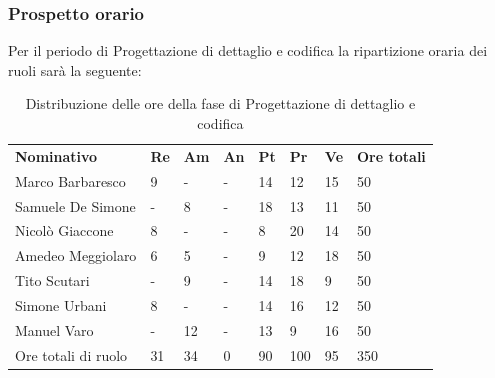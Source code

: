 \subsubsection{Prospetto orario}
Per il periodo di Progettazione di dettaglio e codifica la ripartizione oraria dei ruoli sarà la seguente:
\begin{center}
    \begin{table}[ht!]
        \centering
        \caption{Distribuzione delle ore della fase di Progettazione di dettaglio e codifica}
        \vspace{5px}
        \renewcommand{\arraystretch}{1.8}
        \begin{tabular}{p{100px} p{20px} p{20px} p{20px} p{20px} p{20px} p{20px} p{50px} }
            \rowcolor{logo!70} \textbf{Nominativo} & \textbf{Re} & \textbf{Am} & \textbf{An} & \textbf{Pt} & \textbf{Pr} & \textbf{Ve} & \textbf{Ore totali} \\
            Marco Barbaresco                       & 9           & -           & -           & 14          & 12          & 15          & 50                  \\
            Samuele De Simone                      & -           & 8           & -           & 18          & 13          & 11          & 50                  \\
            Nicolò Giaccone                        & 8           & -           & -           & 8           & 20          & 14          & 50                  \\
            Amedeo Meggiolaro                      & 6           & 5           & -           & 9           & 12          & 18          & 50                  \\
            Tito Scutari                           & -           & 9           & -           & 14          & 18          & 9           & 50                  \\
            Simone Urbani                          & 8           & -           & -           & 14          & 16          & 12          & 50                  \\
            Manuel Varo                            & -           & 12          & -           & 13          & 9           & 16          & 50                  \\
            Ore totali di ruolo                    & 31          & 34          & 0           & 90          & 100         & 95          & 350                 \\
        \end{tabular}
    \end{table}
\end{center}
\pagebreak

